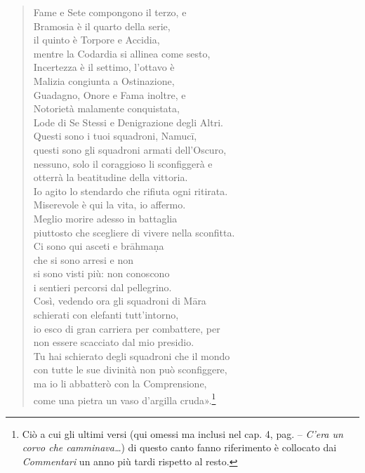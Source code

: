 \begin{quote}
Fame e Sete compongono il terzo, e \\
Bramosia è il quarto della serie, \\
il quinto è Torpore e Accidia, \\
mentre la Codardia si allinea come sesto, \\
Incertezza è il settimo, l’ottavo è \\
Malizia congiunta a Ostinazione, \\
Guadagno, Onore e Fama inoltre, e \\
Notorietà malamente conquistata, \\
Lode di Se Stessi e Denigrazione degli Altri. \\
Questi sono i tuoi squadroni, Namucī, \\
questi sono gli squadroni armati dell’Oscuro, \\
nessuno, solo il coraggioso li sconfiggerà e \\
otterrà la beatitudine della vittoria. \\
Io agito lo stendardo che rifiuta ogni ritirata. \\
Miserevole è qui la vita, io affermo. \\
Meglio morire adesso in battaglia \\
piuttosto che scegliere di vivere nella sconfitta. \\
Ci sono qui asceti e brāhmaṇa \\
che si sono arresi e non \\
si sono visti più: non conoscono \\
i sentieri percorsi dal pellegrino. \\
Così, vedendo ora gli squadroni di Māra \\
schierati con elefanti tutt’intorno, \\
io esco di gran carriera per combattere, per \\
non essere scacciato dal mio presidio. \\
Tu hai schierato degli squadroni che il mondo \\
con tutte le sue divinità non può sconfiggere, \\
ma io li abbatterò con la Comprensione, \\
come una pietra un vaso d’argilla cruda».\footnote{Ciò a cui gli ultimi versi (qui omessi ma inclusi nel cap. 4, pag. \pageref{pag70A} -- \emph{C'era un corvo che camminava\ldots}) di questo canto fanno riferimento è collocato dai \emph{Commentari} un anno più tardi rispetto al resto.}
\end{quote}

